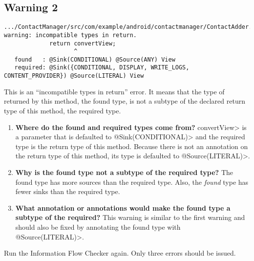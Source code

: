  \subsection{Warning 2}
 \begin{Verbatim}
.../ContactManager/src/com/example/android/contactmanager/ContactAdder.java:387: 
warning: incompatible types in return.
             return convertView;
                    ^
   found   : @Sink(CONDITIONAL) @Source(ANY) View
   required: @Sink({CONDITIONAL, DISPLAY, WRITE_LOGS, CONTENT_PROVIDER}) @Source(LITERAL) View
\end{Verbatim} 
This is an ``incompatible types in return'' error.  It means that the type
of returned by this method, the found type, is not a subtype of the declared 
return type of this method, the required type.
 \begin{enumerate}

\item\textbf{Where do the found and required types come from?}
\<convertView> is a parameter that is defaulted to \<@Sink(CONDITIONAL)> and 
the required type is the return type of this method. Because there is not an
annotation on the return type of this method, its type is defaulted to \<@Source(LITERAL)>.

  \item\textbf{ Why is the found type not a subtype of the required type?}
The found type has more sources than the required type.
 Also, the \emph{found} type has fewer sinks 
than the required type.

  \item\textbf{What annotation or annotations would make the found type a
   subtype of the required?} This warning is similar to the first warning and 
   should also be fixed by annotating the found type with \<@Source(LITERAL)>.\newline
  
   \end{enumerate}

   Run the Information Flow Checker again.  Only three errors should be issued.


